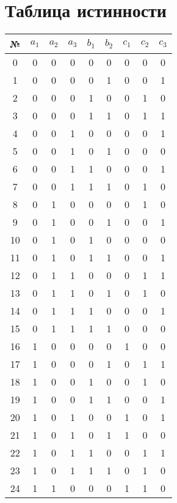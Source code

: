 \documentclass{article}
\begin{document}
\section*{Таблица истинности}
\begin{center}\begin{tabular}{|c|ccc|cc|ccc|}
    \hline № & $a_1$ & $a_2$ & $a_3$ & $b_1$ & $b_2$ & $c_1$ & $c_2$ & $c_3$ \\ \hline
    0 & 0 & 0 & 0 & 0 & 0 & 0 & 0 & 0 \\ \hline
    1 & 0 & 0 & 0 & 0 & 1 & 0 & 0 & 1 \\ \hline
    2 & 0 & 0 & 0 & 1 & 0 & 0 & 1 & 0 \\ \hline
    3 & 0 & 0 & 0 & 1 & 1 & 0 & 1 & 1 \\ \hline
    4 & 0 & 0 & 1 & 0 & 0 & 0 & 0 & 1 \\ \hline
    5 & 0 & 0 & 1 & 0 & 1 & 0 & 0 & 0 \\ \hline
    6 & 0 & 0 & 1 & 1 & 0 & 0 & 0 & 1 \\ \hline
    7 & 0 & 0 & 1 & 1 & 1 & 0 & 1 & 0 \\ \hline
    8 & 0 & 1 & 0 & 0 & 0 & 0 & 1 & 0 \\ \hline
    9 & 0 & 1 & 0 & 0 & 1 & 0 & 0 & 1 \\ \hline
    10 & 0 & 1 & 0 & 1 & 0 & 0 & 0 & 0 \\ \hline
    11 & 0 & 1 & 0 & 1 & 1 & 0 & 0 & 1 \\ \hline
    12 & 0 & 1 & 1 & 0 & 0 & 0 & 1 & 1 \\ \hline
    13 & 0 & 1 & 1 & 0 & 1 & 0 & 1 & 0 \\ \hline
    14 & 0 & 1 & 1 & 1 & 0 & 0 & 0 & 1 \\ \hline
    15 & 0 & 1 & 1 & 1 & 1 & 0 & 0 & 0 \\ \hline
    16 & 1 & 0 & 0 & 0 & 0 & 1 & 0 & 0 \\ \hline
    17 & 1 & 0 & 0 & 0 & 1 & 0 & 1 & 1 \\ \hline
    18 & 1 & 0 & 0 & 1 & 0 & 0 & 1 & 0 \\ \hline
    19 & 1 & 0 & 0 & 1 & 1 & 0 & 0 & 1 \\ \hline
    20 & 1 & 0 & 1 & 0 & 0 & 1 & 0 & 1 \\ \hline
    21 & 1 & 0 & 1 & 0 & 1 & 1 & 0 & 0 \\ \hline
    22 & 1 & 0 & 1 & 1 & 0 & 0 & 1 & 1 \\ \hline
    23 & 1 & 0 & 1 & 1 & 1 & 0 & 1 & 0 \\ \hline
    24 & 1 & 1 & 0 & 0 & 0 & 1 & 1 & 0 \\ \hline

\end{tabular}
\end{center}
\end{document}
